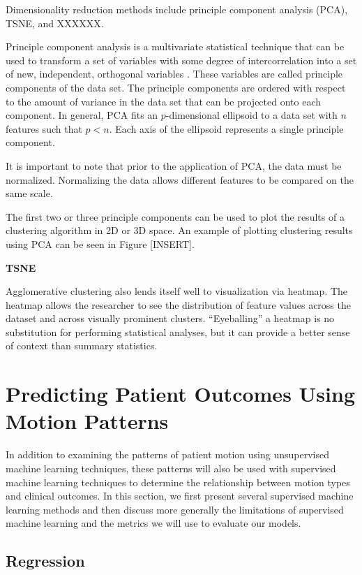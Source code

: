 Dimensionality reduction methods include principle component analysis (PCA), TSNE, and XXXXXX.

Principle component analysis is a multivariate statistical technique that can be used to transform a set of variables with some degree of intercorrelation into a set of new, independent, orthogonal variables \cite{Abdi2010}. These variables are called principle components of the data set. The principle components are ordered with respect to the amount of variance in the data set that can be projected onto each component. In general, PCA fits an $p$-dimensional ellipsoid to a data set with $n$ features such that $p < n$. Each axis of the ellipsoid represents a single principle component. 

It is important to note that prior to the application of PCA, the data must be normalized. Normalizing the data allows different features to be compared on the same scale.

The first two or three principle components can be used to plot the results of a clustering algorithm in 2D or 3D space. An example of plotting clustering results using PCA can be seen in Figure [INSERT].

\textbf{TSNE}

Agglomerative clustering also lends itself well to visualization via heatmap. The heatmap allows the researcher to see the distribution of feature values across the dataset and across visually prominent clusters. ``Eyeballing'' a heatmap is no substitution for performing statistical analyses, but it can provide a better sense of context than summary statistics.  

\section{Predicting Patient Outcomes Using Motion Patterns}

In addition to examining the patterns of patient motion using unsupervised machine learning techniques, these patterns will also be used with supervised machine learning techniques to determine the relationship between motion types and clinical outcomes. In this section, we first present several supervised machine learning methods and then discuss more generally the limitations of supervised machine learning and the metrics we will use to evaluate our models.

\subsection{Regression}

